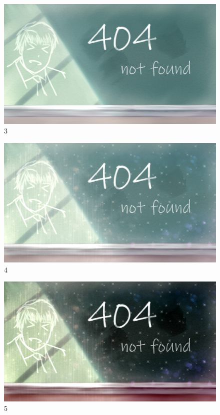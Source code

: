 \documentclass[11pt]{article}
\begin{document}
\begin{spacing}{1.0}
\begin{itemize}
\begin{figure}[H]
	\end{figure}
	\begin{figure}[H]
		\centering
		\includegraphics[scale=.4]{figures/png/3.jpg}
		\caption{3}
	
	\end{figure}
	\begin{figure}[H]
		\centering
		\includegraphics[scale=.4]{figures/png/4.jpg}
		\caption{4}

	\end{figure}
	\begin{figure}[H]
		\centering
		\includegraphics[scale=.4]{figures/png/5.jpg}
		\caption{5}


\end{figure}
\end{itemize}
\end{spacing}
\end{document}
